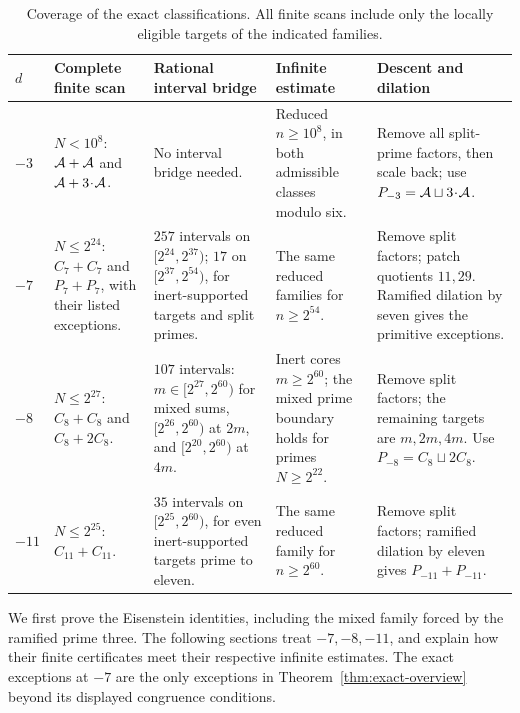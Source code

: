\begin{table}[ht]
\centering\small
\setlength{\tabcolsep}{3pt}
\renewcommand{\arraystretch}{1.13}
\caption{Coverage of the exact classifications.  All finite scans include
only the locally eligible targets of the indicated families.}
\label{tab:exact-coverage}
\begin{tabular}{@{}>{\raggedright\arraybackslash}p{.045\linewidth}>{\raggedright\arraybackslash}p{.17\linewidth}>{\raggedright\arraybackslash}p{.255\linewidth}>{\raggedright\arraybackslash}p{.225\linewidth}>{\raggedright\arraybackslash}p{.24\linewidth}@{}}
\toprule
$d$&Complete finite scan&Rational interval bridge&Infinite estimate&Descent and dilation\\
\midrule
$-3$&$N<10^8$: $\AA+\AA$ and $\AA+3\!\cdot\!\AA$.
&No interval bridge needed.
&Reduced $n\ge10^8$, in both admissible classes modulo six.
&Remove all split-prime factors, then scale back; use $P_{-3}=\AA\sqcup3\!\cdot\!\AA$.\\[3pt]
$-7$&$N\le2^{24}$: $C_7+C_7$ and $P_7+P_7$, with their listed exceptions.
&$257$ intervals on $[2^{24},2^{37})$; $17$ on $[2^{37},2^{54})$, for inert-supported targets and split primes.
&The same reduced families for $n\ge2^{54}$.
&Remove split factors; patch quotients $11,29$.  Ramified dilation by seven gives the primitive exceptions.\\[3pt]
$-8$&$N\le2^{27}$: $C_8+C_8$ and $C_8+2C_8$.
&$107$ intervals: $m\in[2^{27},2^{60})$ for mixed sums, $[2^{26},2^{60})$ at $2m$, and $[2^{20},2^{60})$ at $4m$.
&Inert cores $m\ge2^{60}$; the mixed prime boundary holds for primes $N\ge2^{22}$.
&Remove split factors; the remaining targets are $m,2m,4m$.  Use $P_{-8}=C_8\sqcup2C_8$.\\[3pt]
$-11$&$N\le2^{25}$: $C_{11}+C_{11}$.
&$35$ intervals on $[2^{25},2^{60})$, for even inert-supported targets prime to eleven.
&The same reduced family for $n\ge2^{60}$.
&Remove split factors; ramified dilation by eleven gives $P_{-11}+P_{-11}$.\\
\bottomrule
\end{tabular}
\end{table}

We first prove the Eisenstein identities, including the mixed family
forced by the ramified prime three.  The following sections treat
$-7,-8,-11$, and explain how their finite certificates meet their
respective infinite estimates.  The exact exceptions at $-7$ are the
only exceptions in Theorem~\ref{thm:exact-overview} beyond its displayed
congruence conditions.
